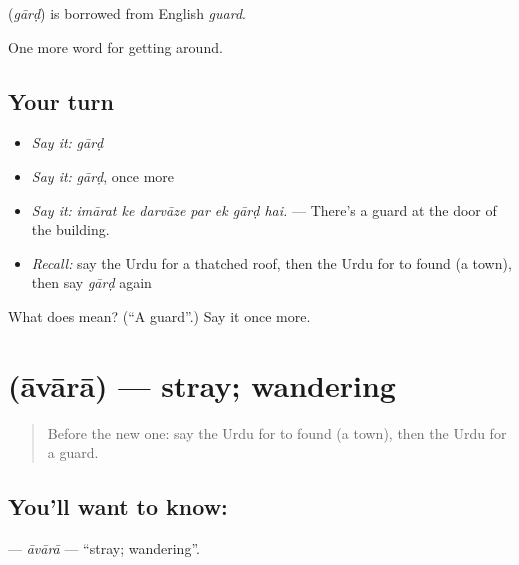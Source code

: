 \begin{cousinweb}
\textbf{} (\emph{gārḍ}) is borrowed from English \emph{guard}.
\end{cousinweb}

\begin{grammarlens}[title={What you've built}]
One more word for getting around.
\end{grammarlens}

\subsection*{Your turn}
\begin{itemize}
\raggedright
  \item \emph{Say it:} \emph{gārḍ}
  \item \emph{Say it:} \emph{gārḍ}, once more
  \item \emph{Say it:} \emph{imārat ke darvāze par ek gārḍ hai.} — There's a guard at the door of the building.
  \item \emph{Recall:} say the Urdu for a thatched roof, then the Urdu for to found (a town), then say \emph{gārḍ} again
\end{itemize}

\begin{tcolorbox}[breakable,colback=teal!4,colframe=teal!35!black,title={Before you move on}]
What does  mean? (\textquotedblleft{}A guard\textquotedblright{}.) Say it once more.
\end{tcolorbox}
\section[\texorpdfstring{\ur{آوارہ} (āvārā)}{آوارہ (āvārā)}]{ (āvārā) — stray; wandering}

\label{lesson:UR-C414-avara}



\begin{quote}
Before the new one: say the Urdu for to found (a town), then the Urdu for a guard.
\end{quote}

\subsection*{You'll want to know: }
\textbf{} — \emph{āvārā} — \textquotedblleft{}stray; wandering\textquotedblright{}.

\begin{quote}
       
\end{quote}

